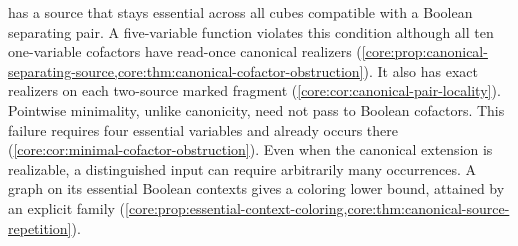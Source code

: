 has a source that stays essential across all cubes compatible with a
Boolean separating pair. A five-variable function violates this condition
although all ten one-variable cofactors have read-once canonical realizers
(\cref{core:prop:canonical-separating-source,core:thm:canonical-cofactor-obstruction}).
It also has exact realizers on each two-source marked fragment
(\cref{core:cor:canonical-pair-locality}).
Pointwise minimality, unlike canonicity, need not pass to Boolean
cofactors. This failure requires four essential variables and already
occurs there (\cref{core:cor:minimal-cofactor-obstruction}).
Even when the canonical extension is realizable, a distinguished input
can require arbitrarily many occurrences. A graph on its essential
Boolean contexts gives a coloring lower bound, attained by an explicit
family (\cref{core:prop:essential-context-coloring,core:thm:canonical-source-repetition}).

